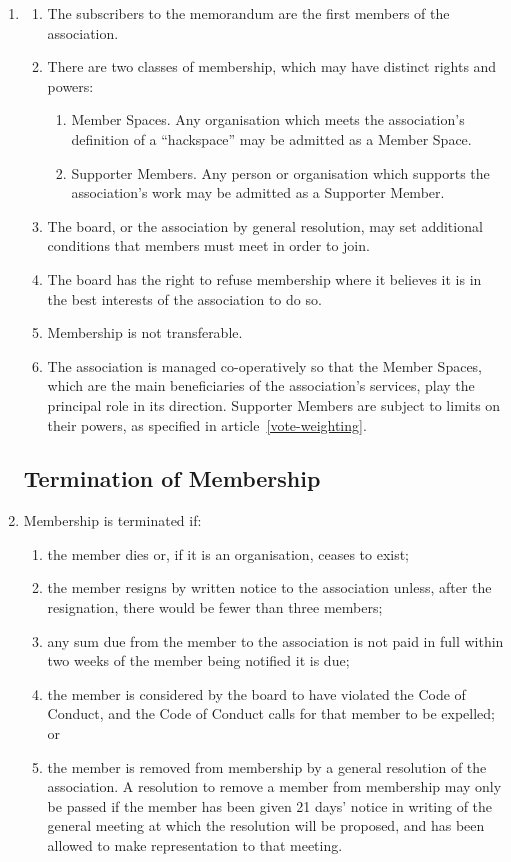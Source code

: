 \begin{enumerate}
\item\label{cls:subscribers}
  \begin{enumerate}
  \item
    The subscribers to the memorandum are the first members of the association.
  \item
    There are two classes of membership, which may have distinct rights and powers:
    \begin{enumerate}
      \item Member Spaces. Any organisation which meets the association's definition
              of a ``hackspace'' may be admitted as a Member Space.
      \item Supporter Members. Any person or organisation which supports the
              association's work may be admitted as a Supporter Member.
    \end{enumerate}
  \item The board, or the association by general resolution, may set additional conditions
        that members must meet in order to join.
  \item The board has the right to refuse membership where it believes it is in the best
        interests of the association to do so.
  \item Membership is not transferable.
  \item The association is managed co-operatively so that the Member Spaces, which are the
        main beneficiaries of the association's services, play the principal role in its
        direction. Supporter Members are subject to limits on their powers, as specified
        in article~\ref{vote-weighting}.
  \end{enumerate}

\subsection{Termination of Membership}

\item
  Membership is terminated if:
  \begin{enumerate}
  \item
    the member dies or, if it is an organisation, ceases to exist;
  \item
    the member resigns by written notice to the association unless, after
    the resignation, there would be fewer than three members;
  \item
    any sum due from the member to the association is not paid in full
    within two weeks of the member being notified it is due;
  \item
    the member is considered by the board to have violated the Code of Conduct,
    and the Code of Conduct calls for that member to be expelled; or
  \item
    the member is removed from membership by a general resolution of the
    association. A resolution to remove a member from membership may only
    be passed if the member has been given 21 days' notice in writing of
    the general meeting at which the resolution will be proposed, and has
    been allowed to make representation to that meeting.
  \end{enumerate}


\end{enumerate}
